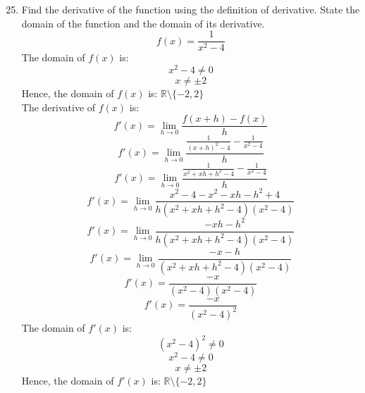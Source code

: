 \documentclass[12pt]{article}
\begin{document}
\begin{enumerate}
    \setcounter{enumi}{24}
    \item Find the derivative of the function using the definition of derivative. State the domain of the function and the domain of its derivative.
          \[f(x) = {\displaystyle \frac{1}{x^2-4}}\]
          The domain of $f(x)$ is:
          \[x^2 - 4 \neq 0\]
          \[x \neq \pm 2\]
          Hence, the domain of $f(x)$ is: $\boxed{\mathds{R} \setminus \{-2,2\}}$\\
          The derivative of $f(x)$ is:
          \[f'(x) = {\displaystyle \lim_{h \to 0} \frac{f(x+h) - f(x)}{h}}\]
          \[f'(x) = {\displaystyle \lim_{h \to 0} \frac{\frac{1}{(x+h)^2-4} - \frac{1}{x^2-4}}{h}}\]
          \[f'(x) = {\displaystyle \lim_{h \to 0} \frac{\frac{1}{x^2+xh+h^2-4} - \frac{1}{x^2-4}}{h}}\]
          \[f'(x) = {\displaystyle \lim_{h \to 0} \frac{x^2-4-x^2-xh-h^2+4}{h(x^2+xh+h^2-4)(x^2-4)}}\]
          \[f'(x) = {\displaystyle \lim_{h \to 0} \frac{-xh-h^2}{h(x^2+xh+h^2-4)(x^2-4)}}\]
          \[f'(x) = {\displaystyle \lim_{h \to 0} \frac{-x-h}{(x^2+xh+h^2-4)(x^2-4)}}\]
          \[f'(x) = {\displaystyle \frac{-x}{(x^2-4)(x^2-4)}}\]
          \[\boxed{f'(x) = {\displaystyle \frac{-x}{(x^2-4)^2}}}\]
          The domain of $f'(x)$ is:
          \[(x^2 - 4)^2 \neq 0\]
          \[x^2 - 4 \neq 0\]
          \[x \neq \pm 2\]
          Hence, the domain of $f'(x)$ is: $\boxed{\mathds{R} \setminus \{-2,2\}}$\\

\end{enumerate}
\end{document}
